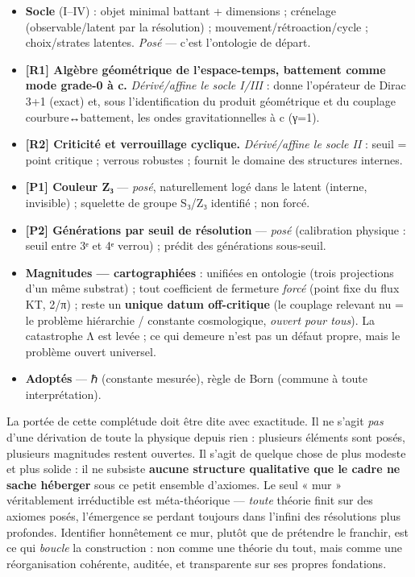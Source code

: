 \documentclass[11pt]{article}
\providecommand{\tightlist}{\setlength{\itemsep}{0pt}\setlength{\parskip}{0pt}}
\begin{document}
\begin{itemize}
\tightlist
\item
  \textbf{Socle} (I--IV) : objet minimal battant + dimensions ;
  crénelage (observable/latent par la résolution) ;
  mouvement/rétroaction/cycle ; choix/strates latentes. \emph{Posé} ---
  c'est l'ontologie de départ.
\item
  \textbf{{[}R1{]} Algèbre géométrique de l'espace-temps, battement
  comme mode grade-0 à c.} \emph{Dérivé/affine le socle I/III} : donne
  l'opérateur de Dirac 3+1 (exact) et, sous l'identification du produit
  géométrique et du couplage courbure↔battement, les ondes
  gravitationnelles à c (γ=1).
\item
  \textbf{{[}R2{]} Criticité et verrouillage cyclique.}
  \emph{Dérivé/affine le socle II} : seuil = point critique ; verrous
  robustes ; fournit le domaine des structures internes.
\item
  \textbf{{[}P1{]} Couleur Z₃} --- \emph{posé}, naturellement logé dans
  le latent (interne, invisible) ; squelette de groupe S₃/Z₃ identifié ;
  non forcé.
\item
  \textbf{{[}P2{]} Générations par seuil de résolution} --- \emph{posé}
  (calibration physique : seuil entre 3ᵉ et 4ᵉ verrou) ; prédit des
  générations sous-seuil.
\item
  \textbf{Magnitudes --- cartographiées} : unifiées en ontologie (trois
  projections d'un même substrat) ; tout coefficient de fermeture
  \emph{forcé} (point fixe du flux KT, 2/π) ; reste un \textbf{unique
  datum off-critique} (le couplage relevant nu = le problème hiérarchie
  / constante cosmologique, \emph{ouvert pour tous}). La catastrophe Λ
  est levée ; ce qui demeure n'est pas un défaut propre, mais le
  problème ouvert universel.
\item
  \textbf{Adoptés} --- ℏ (constante mesurée), règle de Born (commune à
  toute interprétation).
\end{itemize}

La portée de cette complétude doit être dite avec exactitude. Il ne
s'agit \emph{pas} d'une dérivation de toute la physique depuis rien :
plusieurs éléments sont posés, plusieurs magnitudes restent ouvertes. Il
s'agit de quelque chose de plus modeste et plus solide : il ne subsiste
\textbf{aucune structure qualitative que le cadre ne sache héberger}
sous ce petit ensemble d'axiomes. Le seul « mur » véritablement
irréductible est méta-théorique --- \emph{toute} théorie finit sur des
axiomes posés, l'émergence se perdant toujours dans l'infini des
résolutions plus profondes. Identifier honnêtement ce mur, plutôt que de
prétendre le franchir, est ce qui \emph{boucle} la construction : non
comme une théorie du tout, mais comme une réorganisation cohérente,
auditée, et transparente sur ses propres fondations.
\end{document}
